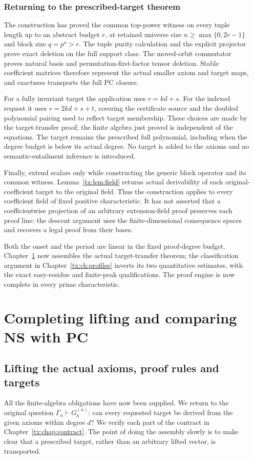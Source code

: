 \documentclass[11pt,a4paper,oneside,openany]{book}
\theoremstyle{definition}\newtheorem{definition}[theorem]{Definition}
\theoremstyle{remark}\newtheorem{remark}[theorem]{Remark}
\numberwithin{equation}{chapter}
\begin{document}
\section*{Returning to the prescribed-target theorem}
The construction has proved the common top-power witness on every
tuple length up to an abstract budget $r$, at retained universe size
$n\ge\max\{0,2r-1\}$ and block size $q=p^a>r$. The tuple purity
calculation and the explicit projector prove exact deletion on the
full support class. The moved-orbit commutator proves natural basis
and permutation-first-factor tensor deletion. Stable coefficient
matrices therefore represent the actual smaller axiom and target
maps, and exactness transports the full PC closure.

For a fully invariant target the application uses $r=kd+s$. For
the indexed request it uses $r=2kd+s+t$, covering the certificate
source and the doubled polynomial pairing used to reflect target
membership. These choices are made by the target-transfer proof;
the finite algebra just proved is independent of the equations.
The target remains the prescribed full polynomial, including when
the degree budget is below its actual degree. No target is added
to the axioms and no semantic-entailment inference is introduced.

Finally, extend scalars only while constructing the generic block
operator and its common witness. Lemma~\ref{tx:lem:field} returns
actual derivability of each original-coefficient target to the original
field. Thus the construction applies to every coefficient field of
fixed positive characteristic. It has not asserted that a coefficientwise
projection of an arbitrary extension-field proof preserves each proof
line: the descent argument uses the finite-dimensional consequence
spaces and recovers a legal proof from their bases.

Both the onset and the period are linear in the fixed proof-degree
budget. Chapter~\ref{tx:chap:assemble-transfer} now assembles the actual
target-transfer theorem; the classification argument in
Chapter~\ref{tx:ch:profiles} inverts its two quantitative estimates,
with the exact easy-residue and finite-peak qualifications. The proof
engine is now complete in every prime characteristic.

\part{Completing lifting and comparing NS with PC}

\chapter{Lifting the actual axioms, proof rules and targets}
\label{tx:chap:assemble-transfer}
All the finite-algebra obligations have now been supplied. We return
to the original question $\Gamma_n\vdash G_b^{(n)}$: can every requested
target be derived from the given axioms within degree $d$? We verify each part of the contract
in Chapter~\ref{tx:chap:contract}. The point of doing the assembly slowly
is to make clear that a prescribed target, rather than an arbitrary
lifted vector, is transported.
\end{document}
